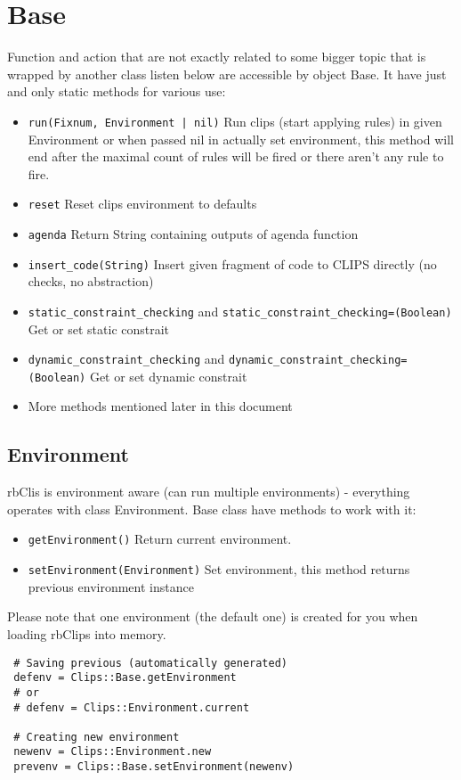 \documentclass[a4paper,10pt]{article}
\begin{document}
\section{Base}
Function and action that are not exactly related to some bigger topic that is wrapped by another class listen below are accessible by object Base. It have just and only static methods for various use:
\begin{itemize}
 \item \texttt{run(Fixnum, Environment | nil)} Run clips (start applying rules) in given Environment or when passed nil in actually set environment, this method will end after the maximal count of rules will be fired or there aren't any rule to fire.
 \item \texttt{reset} Reset clips environment to defaults
 \item \texttt{agenda} Return String containing outputs of agenda function
 \item \texttt{insert\_code(String)} Insert given fragment of code to CLIPS directly (no checks, no abstraction)
 \item \texttt{static\_constraint\_checking} and \texttt{static\_constraint\_checking=(Boolean)} Get or set static constrait
 \item \texttt{dynamic\_constraint\_checking} and \texttt{dynamic\_constraint\_checking=(Boolean)} Get or set dynamic constrait
 \item More methods mentioned later in this document
\end{itemize}

\subsection{Environment}
rbClis is environment aware (can run multiple environments) - everything operates with class Environment. Base class have methods to work with it:
\begin{itemize}
 \item \texttt{getEnvironment()} Return current environment.
 \item \texttt{setEnvironment(Environment)} Set environment, this method returns previous environment instance
\end{itemize}
Please note that one environment (the default one) is created for you when loading rbClips into memory.

\begin{verbatim}
 # Saving previous (automatically generated)
 defenv = Clips::Base.getEnvironment
 # or
 # defenv = Clips::Environment.current

 # Creating new environment
 newenv = Clips::Environment.new
 prevenv = Clips::Base.setEnvironment(newenv)
\end{verbatim}
\end{document}
